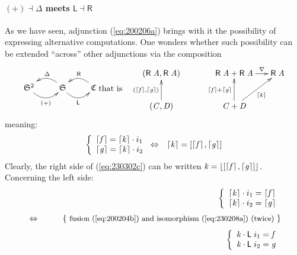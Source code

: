 \documentclass{elsarticle}
\newcommand{\Conid}[1]{\mathit{#1}}
\newcommand{\Varid}[1]{\mathit{#1}}
\def\myxym#1{\vcenter{\xymatrix{#1}}}
\newenvironment{lcbr}{\left\{\begin{array}{l}}{\end{array}\right.}
\def\alt#1#2{\mathopen{[}#1\hskip 1pt,#2\mathclose{]}}
\def\comp{ \mathbin{\cdot} }
\def\fun#1{\mathsf{#1}}
\def\just#1#2{\\ &#1& \rule{2em}{0pt} \{ \mbox{\rule[-.7em]{0pt}{1.8em} \small #2 \/} \} \nonumber\\ && }
\def\cat#1{{\mathfrak #1}}
\def\start{&&}
\def\equiv{\Leftrightarrow}
\begin{document}
\paragraph{\ensuremath{(\mathbin{+})\mathbin\dashv \Delta } meets \ensuremath{\fun L \mathbin\dashv \fun R }}
As we have seen, adjunction (\ref{eq:200206a}) brings with it
the possibility of expressing alternative computations. One wonders whether such 
possibility can be extended ``across'' other adjunctions via the composition
\begin{eqnarray*}
\myxym{
	\ensuremath{{\cat{S}}^{\mathrm{2}}}
		\ar@/_1.0pc/[r]_-{\ensuremath{(\mathbin{+})}}
&
	\ensuremath{\cat{S}}
		\ar@/_1.0pc/[l]_-{\ensuremath{\Delta }}
		\ar@/_1.0pc/[r]_-{\ensuremath{\fun L }}
&
	\ensuremath{\cat{C}}
		\ar@/_1.0pc/[l]_-{\ensuremath{\fun R }}
}
& 
	\hbox{that is}
&
\vcenter{\xymatrix@C=3.5ex{
	\ensuremath{(\fun R \;\Conid{A},\fun R \;\Conid{A})}
&&
	\ensuremath{\fun R \;\Conid{A}\mathbin{+}\fun R \;\Conid{A}}
	\ar[r]^-{\ensuremath{\nabla }}
&
	\ensuremath{\fun R \;\Conid{A}}
\\
	\ensuremath{(\Conid{C},\Conid{D})}
	\ar[u]^{\ensuremath{(\lceil \Varid{f}\rceil,\lceil \Varid{g}\rceil)}}
&&
	\ensuremath{\Conid{C}\mathbin{+}\Conid{D}}
	\ar[u]^{\ensuremath{\lceil \Varid{f}\rceil\mathbin{+}\lceil \Varid{g}\rceil}}
	\ar[ru]_{\ensuremath{\lceil \Varid{k}\rceil}}
}}
\end{eqnarray*}
meaning:
\begin{eqnarray}
	\ensuremath{\begin{lcbr}\lceil \Varid{f}\rceil\mathrel{=}\lceil \Varid{k}\rceil \comp i_1\\\lceil \Varid{g}\rceil\mathrel{=}\lceil \Varid{k}\rceil \comp i_2\end{lcbr}}
&
	\equiv
&
	\ensuremath{\lceil \Varid{k}\rceil\mathrel{=}\alt{\lceil \Varid{f}\rceil}{\lceil \Varid{g}\rceil}}
	\label{eq:230302c}
\end{eqnarray}
Clearly, the right side of (\ref{eq:230302c}) can be written \ensuremath{\Varid{k}\mathrel{=}\lfloor \alt{\lceil \Varid{f}\rceil}{\lceil \Varid{g}\rceil}\rfloor}.
Concerning the left side:  
\begin{eqnarray*}
\start%
	\ensuremath{\begin{lcbr}\lceil \Varid{k}\rceil \comp i_1\mathrel{=}\lceil \Varid{f}\rceil\\\lceil \Varid{k}\rceil \comp i_2\mathrel{=}\lceil \Varid{g}\rceil\end{lcbr}}
%
\just\equiv{ fusion (\ref{eq:200204b}) and isomorphism (\ref{eq:230208a}) (twice) }
%
	\ensuremath{\begin{lcbr}\Varid{k} \comp \fun L \;i_1\mathrel{=}\Varid{f}\\\Varid{k} \comp \fun L \;i_2\mathrel{=}\Varid{g}\end{lcbr}}
\end{eqnarray*}
\end{document}

